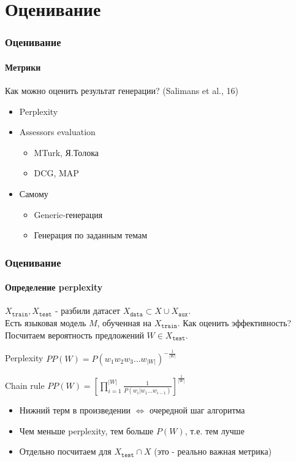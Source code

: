 \documentclass[10pt]{beamer}
\begin{document}
\section{Оценивание}
\begin{frame}
\frametitle{Оценивание}
\framesubtitle{Метрики}

Как можно оценить результат генерации? (Salimans et al., 16)
\begin{itemize}
    \item Perplexity
    \item Assessors evaluation
        \begin{itemize}
            \item MTurk, Я.Толока
            \item DCG, MAP
        \end{itemize}
    \item Самому
        \begin{itemize}
            \item Generic-генерация
            \item Генерация по заданным темам
        \end{itemize}
\end{itemize}

\end{frame}
\begin{frame}
\frametitle{Оценивание}
\framesubtitle{Определение perplexity}

$X_{\texttt{train}}, X_{\texttt{test}}$ - разбили датасет $X_{\texttt{data}} \subset X \cup X_{\texttt{aux}}$. \\
Есть языковая модель $M$, обученная на $X_{\texttt{train}}$. Как оценить эффективность? Посчитаем вероятность предложений $W \in X_{\texttt{test}}$.

\begin{block}{Perplexity}
    $PP(W) = P(w_1w_2w_3\dots w_{|W|})^{-\frac{1}{|W|}}$
\end{block}

\begin{block}{Chain rule}
    $PP(W) = \left[\prod\limits_{i=1}^{|W|}{\frac{1}{P(w_i|w_1\dots w_{i-1})}}\right]^{\frac{1}{|W|}}$
\end{block}

\begin{itemize}
    \item Нижний терм в произведении $\Leftrightarrow$ очередной шаг алгоритма
    \item Чем меньше perplexity, тем больше $P(W)$, т.е. тем лучше
    \item Отдельно посчитаем для $X_{\texttt{test}} \cap X$ (это - реально важная метрика)
\end{itemize}

\end{frame}
\end{document}
